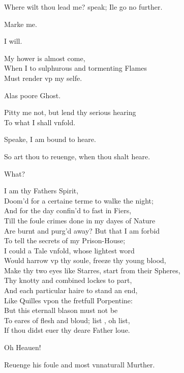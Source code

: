 \documentclass[a5paper,DIV=calc,11pt]{scrbook}
\begin{document}
\begin{drama*}
    \hamspeaks Where wilt thou lead me? speak; Ile go no further.
    
    \ghospeaks Marke me.
    
    \hamspeaks I will.
    
    \ghospeaks My hower is almost come,\\
    When I to sulphurous and tormenting Flames\\
    Must render vp my selfe.
    
    \hamspeaks Alas poore Ghost.
    
    \ghospeaks Pitty me not, but lend thy serious hearing\\
    To what I shall vnfold.
    
    \hamspeaks Speake, I am bound to heare.
    
    \ghospeaks So art thou to reuenge, when thou shalt heare.
    
    \hamspeaks What?
    
    \ghospeaks I am thy Fathers Spirit,\\
    Doom'd for a certaine terme to walke the night;\\
    And for the day confin'd to fast in Fiers,\\
    Till the foule crimes done in my dayes of Nature\\
    Are burnt and purg'd away? But that I am forbid\\
    To tell the secrets of my Prison-House;\\
    I could a Tale vnfold, whose lightest word\\
    Would harrow vp thy soule, freeze thy young blood,\\
    Make thy two eyes like Starres, start from their Spheres,\\
    Thy knotty and combined lockes to part,\\
    And each particular haire to stand an end,\\
    Like Quilles vpon the fretfull Porpentine:\\
    But this eternall blason must not be\\
    To eares of flesh and bloud; list \ham, oh list,\\
    If thou didst euer thy deare Father loue.
    
    \hamspeaks Oh Heauen!
    
    \ghospeaks Reuenge his foule and most vnnaturall Murther.
    

\end{drama*}
\end{document}
